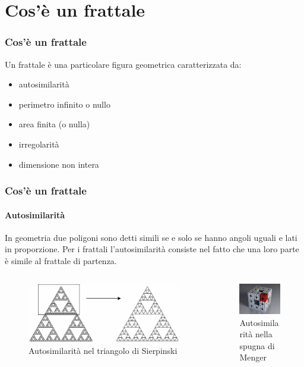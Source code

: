 \documentclass{beamer}
\begin{document}
	\section{Cos'è un frattale}
		\begin{frame}
			\frametitle{Cos'è un frattale}
			Un frattale è una particolare figura geometrica caratterizzata da:
			\begin{itemize}
				\item autosimilarità
				\item perimetro infinito o nullo
				\item area finita (o nulla)
				\item irregolarità
				\item dimensione non intera
			\end{itemize}
		\end{frame}
		\begin{frame}
			\frametitle{Cos'è un frattale}
			\framesubtitle{Autosimilarità}
			In geometria due poligoni sono detti simili se e solo se hanno angoli uguali e lati in proporzione. Per i frattali l'autosimilarità consiste nel fatto che una loro parte è simile al frattale di partenza.
			\bigskip
			\begin{columns}
				\begin{column}{0.5\textwidth}
					\begin{figure}[H]
						\centering
						\includegraphics[width=0.8\linewidth]{"../Varie/autosimilarita"}
						\caption{Autosimilarità nel triangolo di Sierpinski}
						\label{fig:autosimilarita}
					\end{figure}
				\end{column}
				\begin{column}{0.5\textwidth}
					\begin{figure}[h]
						\centering
						\includegraphics[width=0.5\linewidth]{../Varie/menger_autosimile}
						\caption{Autosimilarità nella spugna di Menger}
						\label{fig:mengerautosimile}
					\end{figure}

				\end{column}
			\end{columns}
		\end{frame}
\end{document}
